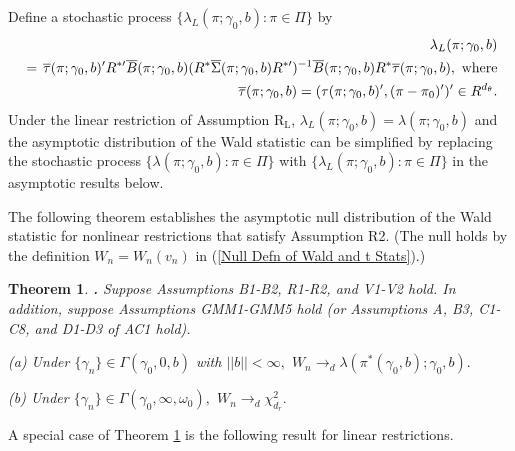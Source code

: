 \documentclass[12pt,titlepage,final,oneside,letterpaper]{article}
\newtheorem{theorem}{Theorem}[section]
\begin{document}
Define a stochastic process $\{\lambda _{L}(\pi ;\gamma _{0},b):\pi \in \Pi
\}$ by%
\begin{eqnarray}
&&\hspace{-0.08in}\lambda _{L}(\pi ;\gamma _{0},b)  \notag \\
&=&\hspace{-0.08in}\overline{\tau }(\pi ;\gamma _{0},b)^{\prime }R^{\ast
\prime }\overline{B}(\pi ;\gamma _{0},b)(R^{\ast }\overline{\Sigma }(\pi
;\gamma _{0},b)R^{\ast \prime })^{-1}\overline{B}(\pi ;\gamma _{0},b)R^{\ast
}\overline{\tau }(\pi ;\gamma _{0},b),\text{ where}  \notag \\
&&\hspace{-0.25in}\overline{\tau }(\pi ;\gamma _{0},b)\overset{}{=}(\tau
(\pi ;\gamma _{0},b)^{\prime },(\pi -\pi _{0})^{\prime })^{\prime }\overset{}%
{\in }R^{d_{\theta }}.  \label{Omega Process}
\end{eqnarray}%
Under the linear restriction of Assumption R$_{\text{L}}$, $\lambda _{L}(\pi
;\gamma _{0},b)=\lambda (\pi ;\gamma _{0},b)$ and the asymptotic
distribution of the Wald statistic can be simplified by replacing the
stochastic process $\{\lambda (\pi ;\gamma _{0},b):\pi \in \Pi \}$ with $%
\{\lambda _{L}(\pi ;\gamma _{0},b):\pi \in \Pi \}$ in the asymptotic results
below.

The following theorem establishes the asymptotic null distribution of the
Wald statistic for nonlinear restrictions that satisfy Assumption R2. (The
null holds by the definition $W_{n}=W_{n}(v_{n})$ in (\ref{Null Defn of Wald
and t Stats}).)

\begin{theorem}
\hspace{-0.08in}\textbf{.} \label{Theorem Wald Nonlinear}Suppose Assumptions 
\emph{B1-B2, R1-R2, }and \emph{V1-V2 }hold. In addition, suppose Assumptions 
\emph{GMM1-GMM5 }hold \emph{(}or Assumptions \emph{A, B3, C1-C8, }and \emph{%
D1-D3} of \emph{AC1 }hold\emph{).}

\noindent \emph{(a) }Under $\{\gamma _{n}\}\in \Gamma (\gamma _{0},0,b)$
with $||b||<\infty ,$ $W_{n}\rightarrow _{d}\lambda (\pi ^{\ast }(\gamma
_{0},b);\gamma _{0},b).$

\noindent \emph{(b) }Under $\{\gamma _{n}\}\in \Gamma (\gamma _{0},\infty
,\omega _{0}),$ $W_{n}\rightarrow _{d}\chi _{d_{r}}^{2}.$
\end{theorem}

A special case of Theorem \ref{Theorem Wald Nonlinear} is the following
result for linear restrictions.
\end{document}
